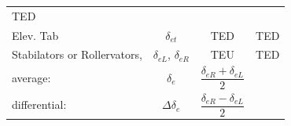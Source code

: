 \documentclass[
]{book}
\begin{document}
\begin{longtable}[]{@{}lccc@{}}
\begin{minipage}[t]{0.27\columnwidth}
TED\strut
\end{minipage}\tabularnewline
\begin{minipage}[t]{0.19\columnwidth}\raggedright
Elev. Tab\strut
\end{minipage} & \begin{minipage}[t]{0.14\columnwidth}\centering
\(\delta_{et}\)\strut
\end{minipage} & \begin{minipage}[t]{0.29\columnwidth}\centering
TED\strut
\end{minipage} & \begin{minipage}[t]{0.27\columnwidth}\centering
TED\strut
\end{minipage}\tabularnewline
\begin{minipage}[t]{0.19\columnwidth}\raggedright
Stabilators or Rollervators,\strut
\end{minipage} & \begin{minipage}[t]{0.14\columnwidth}\centering
\(\delta_{eL}\),
\(\delta_{eR}\)\strut
\end{minipage} & \begin{minipage}[t]{0.29\columnwidth}\centering
TEU\strut
\end{minipage} & \begin{minipage}[t]{0.27\columnwidth}\centering
TED\strut
\end{minipage}\tabularnewline
\begin{minipage}[t]{0.19\columnwidth}\raggedright
average:\strut
\end{minipage} & \begin{minipage}[t]{0.14\columnwidth}\centering
\(\delta_e\)\strut
\end{minipage} & \begin{minipage}[t]{0.29\columnwidth}\centering
\[\frac{\delta_{eR} + \delta_{eL}}{2}\]\strut
\end{minipage} & \begin{minipage}[t]{0.27\columnwidth}\centering
\strut
\end{minipage}\tabularnewline
\begin{minipage}[t]{0.19\columnwidth}\raggedright
differential:\strut
\end{minipage} & \begin{minipage}[t]{0.14\columnwidth}\centering
\(\Delta\delta_e\)\strut
\end{minipage} & \begin{minipage}[t]{0.29\columnwidth}\centering
\[\frac{\delta_{eR} - \delta_{eL}}{2}\]\strut
\end{minipage} & \begin{minipage}[t]{0.27\columnwidth}\centering

\end{minipage}
\end{longtable}
\end{document}
